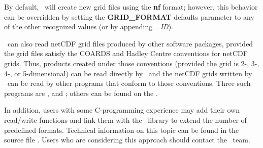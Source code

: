 By default, \GMT\ will create new grid files using the \textbf{nf} format; however,
this behavior can be overridden by setting the \textbf{GRID\_FORMAT} defaults parameter
to any of the other recognized values (or by appending \emph{=ID}).

\GMT\ can also read netCDF grid files produced by other software packages, provided the grid files
satisfy the COARDS and Hadley Centre conventions for netCDF grids. Thus, products created under
those conventions (provided the grid is 2-, 3-, 4-, or 5-dimensional) can be read directly by \GMT\ and the netCDF grids
written by \GMT\ can be read by other programs that conform to those conventions. Three such programs are
,
and
; others can be found
on the .

In addition, users with some C-programming experience may add
their own read/write functions and link them with the \GMT\ library
to extend the number of predefined formats.  Technical information
on this topic can be found in the source file . 
Users who are considering this approach should contact the \GMT\ team.

